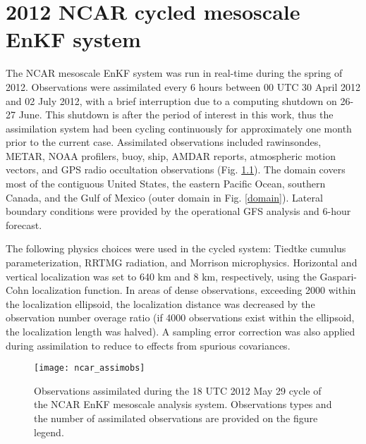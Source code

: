 \chapter{2012 NCAR cycled mesoscale EnKF system}
The NCAR mesoscale EnKF system was run in real-time during the spring of 2012. Observations were assimilated every 6 hours between 00 UTC 30 April 2012 and 02 July 2012, with a brief interruption due to a computing shutdown on 26-27 June. This shutdown is after the period of interest in this work, thus the assimilation system had been cycling continuously for approximately one month prior to the current case. Assimilated observations included rawinsondes, METAR, NOAA profilers, buoy, ship, AMDAR reports, atmospheric motion vectors, and GPS radio occultation observations (Fig. \ref{ncar_assimobs}). The domain covers most of the contiguous United States, the eastern Pacific Ocean, southern Canada, and the Gulf of Mexico (outer domain in Fig. \ref{domain}). Lateral boundary conditions were provided by the operational GFS analysis and 6-hour forecast.

The following physics choices were used in the cycled system: Tiedtke cumulus parameterization, RRTMG radiation, and Morrison microphysics. Horizontal and vertical localization was set to 640 km and 8 km, respectively, using the Gaspari-Cohn localization function. In areas of dense observations, exceeding 2000 within the localization ellipsoid, the localization distance was decreased by the observation number overage ratio (if 4000 observations exist within the ellipsoid, the localization length was halved). A sampling error correction \citep{anderson12} was also applied during assimilation to reduce to effects from spurious covariances.

\begin{figure}
\centering
\texttt{[image: ncar\_assimobs]}
\caption{Observations assimilated during the 18 UTC 2012 May 29 cycle of the NCAR EnKF mesoscale analysis system. Observations types and the number of assimilated observations are provided on the figure legend.}
\label{ncar_assimobs}
\end{figure}
